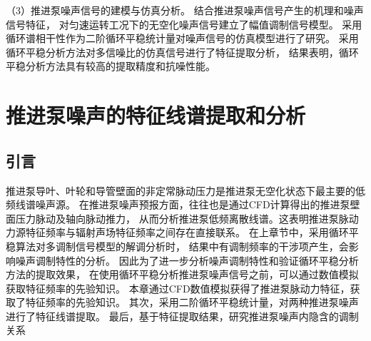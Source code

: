（3）推进泵噪声信号的建模与仿真分析。
结合推进泵噪声信号产生的机理和噪声信号特征，
对匀速运转工况下的无空化噪声信号建立了幅值调制信号模型。
采用循环谱相干性作为二阶循环平稳统计量对噪声信号的仿真模型进行了研究。
采用循环平稳分析方法对多信噪比的仿真信号进行了特征提取分析，
结果表明，循环平稳分析方法具有较高的提取精度和抗噪性能。

\chapter{推进泵噪声的特征线谱提取和分析}
\section{引言}
\begin{comment}
由经典声学理论可知，脉动力源远场辐射噪声的声压表达式为
\begin{equation}
    \label{equ:p}
    p\left ( \mathbf{r} ,t \right ) =\frac{\mathbf{F}\cdot \mathbf{r} }{4\pi rc} =\frac{F\left ( t' \right ) }{4\pi rc}\cos \theta  
\end{equation}
式中，$t'$为迟滞时间，$\mathbf{F}$为脉动力，$r$为脉动力源到测点距离，$\theta$为与矢量之间夹角，
$\cos \theta$项用于表征脉动力源的偶极声场指向性，该式表明了脉动力源与其辐射声场之间的直接联系\cite{__2016杨琼方}。
\end{comment}
推进泵导叶、叶轮和导管壁面的非定常脉动压力是推进泵无空化状态下最主要的低频线谱噪声源\cite{__2016杨琼方}。
在推进泵噪声预报方面，往往也是通过CFD计算得出的推进泵壁面压力脉动及轴向脉动推力，
从而分析推进泵低频离散线谱。这表明推进泵脉动力源特征频率与辐射声场特征频率之间存在直接联系。
在上章节中，采用循环平稳算法对多调制信号模型的解调分析时，
结果中有调制频率的干涉项产生，会影响噪声调制特性的分析。
因此为了进一步分析噪声调制特性和验证循环平稳分析方法的提取效果，
在使用循环平稳分析推进泵噪声信号之前，可以通过数值模拟获取特征频率的先验知识。
本章通过CFD数值模拟获得了推进泵脉动力特征，获取了特征频率的先验知识。
其次，采用二阶循环平稳统计量，对两种推进泵噪声进行了特征线谱提取。
最后，基于特征提取结果，研究推进泵噪声内隐含的调制关系

\begin{comment}
    
推进泵噪声是推进泵流致激励特性的最直接的外在表现，
推进泵噪声信号中包含着丰富的运行状态和流致激励源特性，
前面章节的研究表明推进泵噪声的频谱呈现出宽带与线谱交叠的形貌，中低频线谱成分复杂，
噪声信噪比较低，特征信号如流致激励源特征频率、轴频等与其他背景噪声相比均较为微弱，
给基于传统噪声特征提取方法带来了困难，难以准确的获得推进泵的工作状态和结构信息。
上章节通过对噪声的成分分析，基于推进泵噪声的循环平稳特征，推导出流致激励源-噪声信号的幅值调制模型。
进一步为了验证从噪声信号中提取流致激励源特征的合理性和可行性，
本章节通过非定常数值模拟计算获取了多工况下推进泵的激励力信号，
分析了推进泵流致振动噪声源的关键特性，
采用循环平稳分析方法实现推进泵低频特征的提取，
联合从噪声信号中提取特征频率的结果与流致激励源的模拟结果，
从噪声信号中分析出流致激励源对噪声的影响程度以及两者的作用机理，
探究推进泵噪声的调制特性。
\end{comment}
